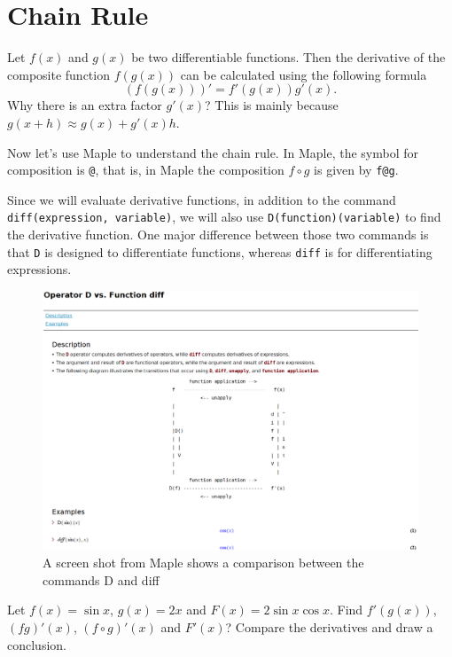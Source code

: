 \documentclass[]{book}
\theoremstyle{definition}
\theoremstyle{definition}
\theoremstyle{definition}
\theoremstyle{remark}
\let\BeginKnitrBlock\begin \let\EndKnitrBlock\end
\begin{document}
\hypertarget{chain-rule}{%
\section{Chain Rule}\label{chain-rule}}

Let \(f(x)\) and \(g(x)\) be two differentiable functions. Then the derivative of the composite function \(f(g(x))\) can be calculated using the following formula
\[
(f(g(x)))'=f'(g(x))g'(x).
\]
Why there is an extra factor \(g'(x)\)? This is mainly because \(g(x+h)\approx g(x)+g'(x)h\).

Now let's use Maple to understand the chain rule. In Maple, the symbol for composition is \texttt{@}, that is, in Maple the composition \(f\circ g\) is given by \texttt{f@g}.

Since we will evaluate derivative functions, in addition to the command \texttt{diff(expression,\ variable)}, we will also use \texttt{D(function)(variable)} to find the derivative function. One major difference between those two commands is that \texttt{D} is designed to differentiate functions, whereas \texttt{diff} is for differentiating expressions.

\begin{figure}
\centering
\includegraphics{figs/D_vs_diff.png}
\caption{A screen shot from Maple shows a comparison between the commands D and diff}
\end{figure}

\BeginKnitrBlock{example}
\protect\hypertarget{exm:unnamed-chunk-57}{}{\label{exm:unnamed-chunk-57} }
Let \(f(x)=\sin x\), \(g(x)=2x\) and \(F(x)=2\sin x\cos x\). Find \(f'(g(x))\), \((fg)'(x)\), \((f\circ g)'(x)\) and \(F'(x)\)?
Compare the derivatives and draw a conclusion.
\EndKnitrBlock{example}
\end{document}
